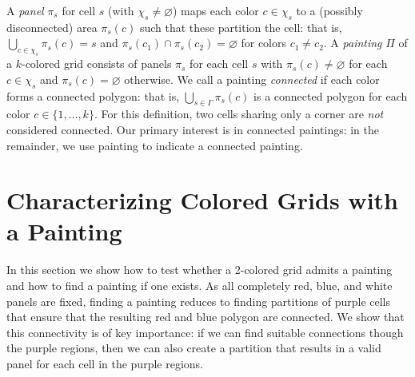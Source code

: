 \documentclass[runningheads]{llncs}
\let\emptyset\varnothing
\begin{document}
A \emph{panel} $\pi_s$ for cell $s$ (with $\chi_s \neq \emptyset$) maps each color $c \in \chi_s$ to a (possibly disconnected) area $\pi_s(c)$ such that these partition the cell: that is, $\bigcup_{c \in \chi_s} \pi_s(c) = s$ and $\pi_s(c_1) \cap \pi_s(c_2) = \emptyset$ for colors $c_1 \neq c_2$.
A \emph{painting} $\Pi$ of a $k$-colored grid consists of panels $\pi_s$ for each cell $s$ with $\pi_s(c)\not=\emptyset$ for each $c \in \chi_s$ and $\pi_s(c) = \emptyset$ otherwise.
We call a painting \emph{connected} if each color forms a connected polygon: that is, $\bigcup_{s\in \Gamma} \pi_s(c)$ is a connected polygon for each color $c \in \{1,\ldots,k\}$.
For this definition, two cells sharing only a corner are \emph{not} considered connected.
Our primary interest is in connected paintings: in the remainder, we use painting to indicate a connected painting.

\section{Characterizing Colored Grids with a Painting}
\label{sec:testing}

In this section we show how to test whether a 2-colored grid admits a painting and how to find a painting if one exists.
As all completely red, blue, and white panels are fixed, finding a painting reduces to finding partitions of purple cells that ensure that the resulting red and blue polygon are connected.
We show that this connectivity is of key importance: if we can find suitable connections though the purple regions, then we can also create a partition that results in a valid panel for each cell in the purple regions.
\end{document}
